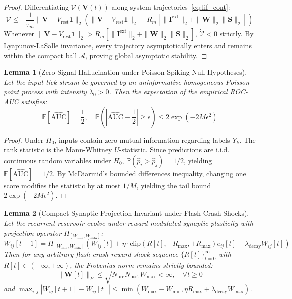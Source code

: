 \documentclass[journal,twocolumn,10pt]{article}
\newtheorem{lemma}{Lemma}
\begin{document}
\begin{proof}
Differentiating $\mathcal{V}(\mathbf{V}(t))$ along system trajectories~\eqref{eq:lif_cont}:
\begin{equation*}
\dot{\mathcal{V}} \le - \frac{1}{\tau_m} \|\mathbf{V} - V_{\text{rest}} \mathbf{1}\|_2 \left( \|\mathbf{V} - V_{\text{rest}} \mathbf{1}\|_2 - R_m \left[ \|\mathbf{I}^{\text{ext}}\|_2 + \|\mathbf{W}\|_2 \|\mathbf{S}\|_2 \right] \right)
\end{equation*}
Whenever $\|\mathbf{V} - V_{\text{rest}} \mathbf{1}\|_2 > R_m [ \|\mathbf{I}^{\text{ext}}\|_2 + \|\mathbf{W}\|_2 \|\mathbf{S}\|_2 ]$, $\dot{\mathcal{V}} < 0$ strictly. By Lyapunov-LaSalle invariance, every trajectory asymptotically enters and remains within the compact ball $\mathcal{A}$, proving global asymptotic stability.
\end{proof}

\begin{lemma}[Zero Signal Hallucination under Poisson Spiking Null Hypotheses]
\label{lem:noise}
Let the input tick stream be governed by an uninformative homogeneous Poisson point process with intensity $\lambda_0 > 0$. Then the expectation of the empirical ROC-AUC satisfies:
\begin{equation}
\mathbb{E} \left[ \widehat{\text{AUC}} \right] = \frac{1}{2}, \quad \mathbb{P} \left( \left| \widehat{\text{AUC}} - \frac{1}{2} \right| \ge \epsilon \right) \le 2 \exp\left( -2 M \epsilon^2 \right)
\end{equation}
\end{lemma}

\begin{proof}
Under $H_0$, inputs contain zero mutual information regarding labels $Y_k$. The rank statistic is the Mann-Whitney $U$-statistic. Since predictions are i.i.d. continuous random variables under $H_0$, $\mathbb{P}(\hat{p}_i > \hat{p}_j) = 1/2$, yielding $\mathbb{E}[\widehat{\text{AUC}}] = 1/2$. By McDiarmid's bounded differences inequality, changing one score modifies the statistic by at most $1/M$, yielding the tail bound $2 \exp(-2 M \epsilon^2)$.
\end{proof}

\begin{lemma}[Compact Synaptic Projection Invariant under Flash Crash Shocks]
\label{lem:synaptic_proj}
Let the recurrent reservoir evolve under reward-modulated synaptic plasticity with projection operator $\Pi_{[W_{\min}, W_{\max}]}$:
\begin{equation}
W_{i j}[t+1] = \Pi_{[W_{\min}, W_{\max}]} \left( W_{i j}[t] + \eta \cdot \text{clip}(R[t], -R_{\max}, +R_{\max}) e_{i j}[t] - \lambda_{\text{decay}} W_{i j}[t] \right)
\end{equation}
Then for any arbitrary flash-crash reward shock sequence $\{R[t]\}_{t=0}^\infty$ with $R[t] \in (-\infty, +\infty)$, the Frobenius norm remains strictly bounded:
\begin{equation}
\|\mathbf{W}[t]\|_F \le \sqrt{N_{\text{pre}} N_{\text{post}}} W_{\max} < \infty, \quad \forall t \ge 0
\end{equation}
and $\max_{i, j} |W_{i j}[t+1] - W_{i j}[t]| \le \min(W_{\max} - W_{\min}, \eta R_{\max} + \lambda_{\text{decay}} W_{\max})$.
\end{lemma}
\end{document}
